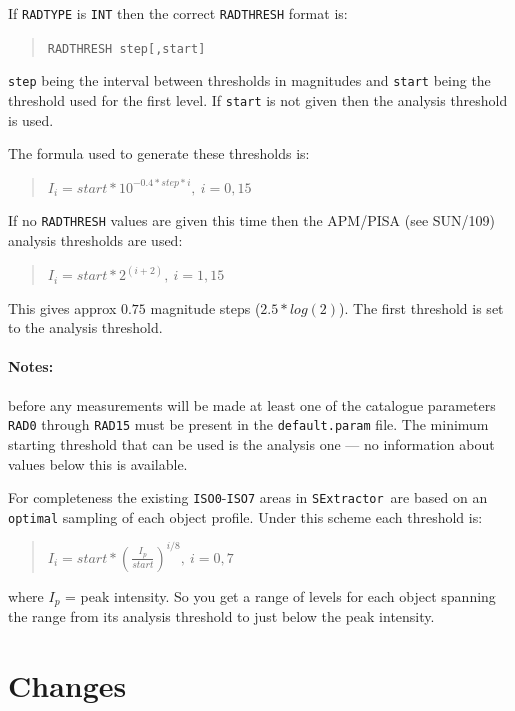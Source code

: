 \documentclass[twoside,11pt]{article}
\newcommand{\xref}[3]{#1}
\renewcommand{\_}{\texttt{\symbol{95}}}
\newcommand{\SExtractor}{\texttt{SExtractor}}
\begin{document}
If \texttt{RAD\_TYPE} is \texttt{INT} then the correct
\texttt{RAD\_THRESH} format is:
\begin{quote}
   \texttt{RAD\_THRESH \hspace{0.5in} step[,start]}
\end{quote}
\texttt{step} being the interval between thresholds in magnitudes
and \texttt{start} being the threshold used for the first level. If
\texttt{start} is not given then the analysis threshold is used.

The formula used to generate these thresholds is:
\begin{quote}
    $I_{i} = start * 10^{-0.4*step*i},\ i = 0, 15$
\end{quote}

If no \texttt{RAD\_THRESH} values are given this time then the
APM/PISA (see \xref{SUN/109}{sun109}{}) analysis thresholds are used:
\begin{quote}
    $I_{i} = start * 2^{(i+2)},\ i = 1, 15$
\end{quote}
This gives approx $0.75$ magnitude steps ($2.5*log(2)$). The first
threshold is set to the analysis threshold.

\paragraph{Notes:} before any measurements will be made at least one
of the catalogue parameters \texttt{RAD0} through \texttt{RAD15} must
be present in the \texttt{default.param} file. The minimum starting
threshold that can be used is the analysis one ---  no information about
values below this is available.

For completeness the existing \texttt{ISO0}-\texttt{ISO7} areas in
\SExtractor\ are based on an \texttt{optimal} sampling of each object
profile. Under this scheme each threshold is:
\begin{quote}
    $I_{i} = start * (\frac{I_{p}}{start})^{i/8}, \ i = 0, 7$
\end{quote}
where $I_{p}$ = peak intensity.  So you get a range of levels for each
object spanning the range from its analysis threshold to just below
the peak intensity.

\section{Changes}
\end{document}
